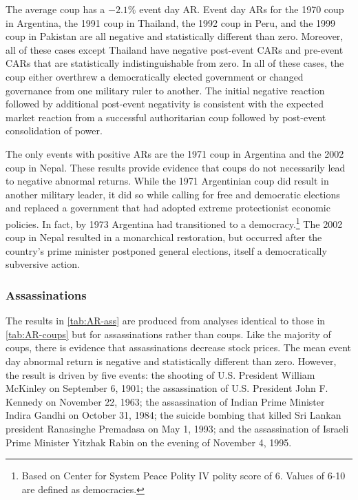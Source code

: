 \documentclass[12pt,final,fleqn]{article}
\theoremstyle{plain}
\begin{document}
The average coup has a $-2.1\%$ event day AR. Event day ARs for the 1970 coup in Argentina, the 1991 coup in Thailand, the 1992 coup in Peru, and the 1999 coup in Pakistan are all negative and statistically different than zero. Moreover, all of these cases except Thailand have negative post-event CARs and pre-event CARs that are statistically indistinguishable from zero. In all of these cases, the coup either overthrew a democratically elected government or changed governance from one military ruler to another. The initial negative reaction followed by additional post-event negativity is consistent with the expected market reaction from a successful authoritarian coup followed by post-event consolidation of power. 

The only events with positive ARs are the 1971 coup in Argentina and the 2002 coup in Nepal. These results provide evidence that coups do not necessarily lead to negative abnormal returns. While the 1971 Argentinian coup did result in another military leader, it did so while calling for free and democratic elections and replaced a government that had adopted extreme protectionist economic policies. In fact, by 1973 Argentina had transitioned to a democracy.\footnote{Based on Center for System Peace Polity IV polity score of 6. Values of 6-10 are defined as democracies.} The 2002 coup in Nepal resulted in a monarchical restoration, but occurred after the country's prime minister postponed general elections, itself a democratically subversive action.  

\subsubsection{Assassinations} \label{subsec: Assassinations}

The results in \autoref{tab:AR-ass} are produced from analyses identical to those in \autoref{tab:AR-coups} but for assassinations rather than coups. Like the majority of coups, there is evidence that assassinations decrease stock prices. The mean event day abnormal return is negative and statistically different than zero. However, the result is driven by five events: the shooting of U.S. President William McKinley on September 6, 1901; the assassination of U.S. President John F. Kennedy on November 22, 1963; the assassination of Indian Prime Minister Indira Gandhi on October 31, 1984; the suicide bombing that killed Sri Lankan president Ranasinghe Premadasa on May 1, 1993; and the assassination of Israeli Prime Minister Yitzhak Rabin on the evening of November 4, 1995.
\end{document}
